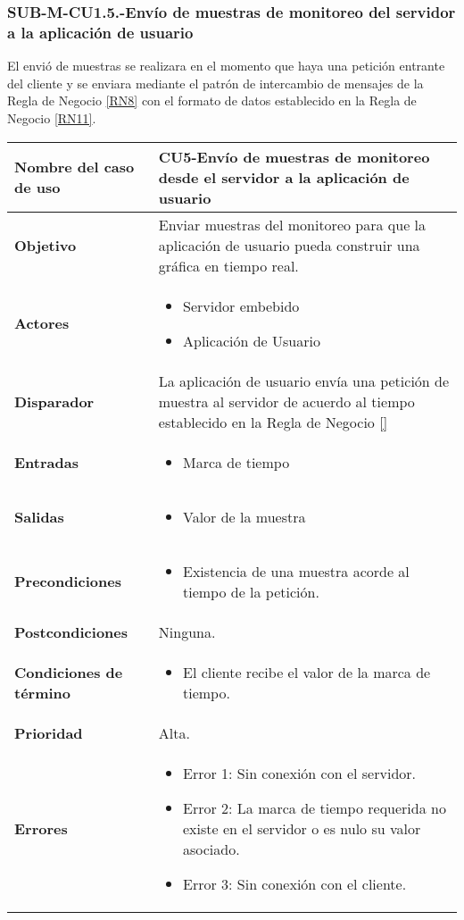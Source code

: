 \subsubsection{SUB-M-CU1.5.-Envío de muestras de monitoreo del servidor a la aplicación de usuario}\label{SUB-M-CU1.5}
El envió de muestras se realizara en el momento que haya una petición entrante del cliente y se enviara mediante el patrón de intercambio de mensajes de la Regla de Negocio \ref{RN8} con el formato de datos establecido en la Regla de Negocio \ref{RN11}. 

\begin{longtable}{|J{5cm}|J{10.3cm}|}
	\hline
	\textbf{Nombre del caso de uso} &
		CU5-Envío de muestras de monitoreo desde el servidor a la aplicación de usuario \\ \hline
	\textbf{Objetivo} &
		Enviar muestras del monitoreo para que la aplicación de usuario pueda construir una gráfica en tiempo real. \\ \hline
	\textbf{Actores} &
		\begin{itemize}
			\item Servidor embebido
			\item Aplicación de Usuario
		\end{itemize} \\ \hline
	\textbf{Disparador} & 
		La aplicación de usuario envía una petición de muestra al servidor de acuerdo al tiempo establecido en la Regla de Negocio \ref{}\\ \hline 
	\textbf{Entradas} & 
		\begin{itemize}
				\item Marca de tiempo
		\end{itemize}\\ \hline 
	\textbf{Salidas} & 
		\begin{itemize}
			\item Valor de la muestra
		\end{itemize} \\ \hline
	\textbf{Precondiciones} &
		\begin{itemize}
			\item Existencia de una muestra acorde al tiempo de la petición.
		\end{itemize}\\ \hline
	\textbf{Postcondiciones} &
		Ninguna.\\ \hline
	\textbf{Condiciones de término} & 
		\begin{itemize}
			\item El cliente recibe el valor de la marca de tiempo.
		\end{itemize} \\ \hline 
	\textbf{Prioridad} & 
		Alta. \\ \hline
	\textbf{Errores} & 
		\begin{itemize}
		    \item \label{CU5:Error1} Error 1: Sin conexión con el servidor.
			\item \label{CU5:Error2} Error 2: La marca de tiempo requerida no existe en el servidor o es nulo su valor asociado.
		    \item \label{CU5:Error3} Error 3: Sin conexión con el cliente.
			

\end{itemize}
\end{longtable}
